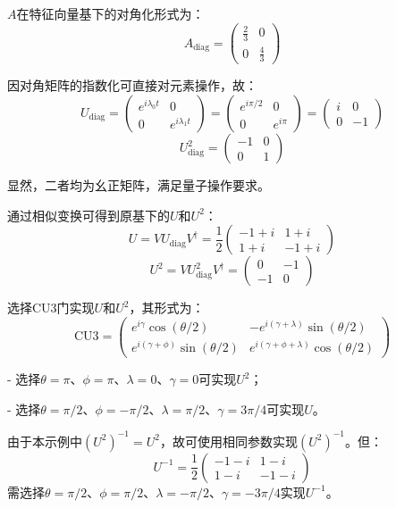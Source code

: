 \documentclass{article}
\begin{document}
\(A\)在特征向量基下的对角化形式为：
\[
A_{\text{diag}} = \begin{pmatrix} \frac{2}{3} & 0 \\ 0 & \frac{4}{3} \end{pmatrix}
\]

因对角矩阵的指数化可直接对元素操作，故：
\[
U_{\text{diag}} = \begin{pmatrix} e^{i\lambda_0 t} & 0 \\ 0 & e^{i\lambda_1 t} \end{pmatrix} = \begin{pmatrix} e^{i\pi/2} & 0 \\ 0 & e^{i\pi} \end{pmatrix} = \begin{pmatrix} i & 0 \\ 0 & -1 \end{pmatrix}
\]
\[
U_{\text{diag}}^2 = \begin{pmatrix} -1 & 0 \\ 0 & 1 \end{pmatrix}
\]

显然，二者均为幺正矩阵，满足量子操作要求。

通过相似变换可得到原基下的\(U\)和\(U^2\)：
\[
U = V U_{\text{diag}} V^\dagger = \frac{1}{2} \begin{pmatrix} -1+i & 1+i \\ 1+i & -1+i \end{pmatrix} 
\]
\[
U^2 = V U_{\text{diag}}^2 V^\dagger = \begin{pmatrix} 0 & -1 \\ -1 & 0 \end{pmatrix}
\]

选择CU3门实现\(U\)和\(U^2\)，其形式为：
\[
\text{CU3} = \begin{pmatrix} e^{i\gamma}\cos(\theta/2) & -e^{i(\gamma+\lambda)}\sin(\theta/2) \\ e^{i(\gamma+\phi)}\sin(\theta/2) & e^{i(\gamma+\phi+\lambda)}\cos(\theta/2) \end{pmatrix}
\]

- 选择\(\theta = \pi\)、\(\phi = \pi\)、\(\lambda = 0\)、\(\gamma = 0\)可实现\(U^2\)；

- 选择\(\theta = \pi/2\)、\(\phi = -\pi/2\)、\(\lambda = \pi/2\)、\(\gamma = 3\pi/4\)可实现\(U\)。

由于本示例中\({(U^2)}^{-1} = U^2\)，故可使用相同参数实现\({(U^2)}^{-1}\)。但：
\[
U^{-1} = \frac{1}{2} \begin{pmatrix} -1-i & 1-i \\ 1-i & -1-i \end{pmatrix}
\]
需选择\(\theta = \pi/2\)、\(\phi = \pi/2\)、\(\lambda = -\pi/2\)、\(\gamma = -3\pi/4\)实现\(U^{-1}\)。
\end{document}
